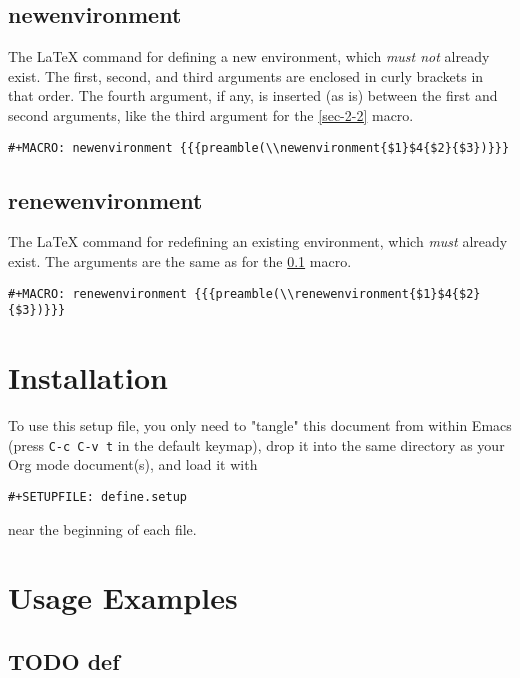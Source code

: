 \documentclass[11pt]{article}
\begin{document}
\subsection{newenvironment}
\label{sec-2-4}

The \LaTeX{} command for defining a new environment, which \emph{must not}
already exist.  The first, second, and third arguments are enclosed in
curly brackets in that order.  The fourth argument, if any, is
inserted (as is) between the first and second arguments, like the
third argument for the \ref{sec-2-2} macro.

\begin{verbatim}
#+MACRO: newenvironment {{{preamble(\\newenvironment{$1}$4{$2}{$3})}}}
\end{verbatim}

\subsection{renewenvironment}
\label{sec-2-5}

The \LaTeX{} command for redefining an existing environment, which \emph{must}
already exist.  The arguments are the same as for the \ref{sec-2-4}
macro.

\begin{verbatim}
#+MACRO: renewenvironment {{{preamble(\\renewenvironment{$1}$4{$2}{$3})}}}
\end{verbatim}

\section{Installation}
\label{sec-3}

To use this setup file, you only need to "tangle" this document from
within Emacs (press \verb~C-c C-v t~ in the default keymap), drop it into
the same directory as your Org mode document(s), and load it with
\begin{verbatim}
#+SETUPFILE: define.setup
\end{verbatim}
near the beginning of each file.

\section{Usage Examples}
\label{sec-4}

\subsection{{\bfseries\sffamily TODO} def}
\label{sec-4-1}
\end{document}
